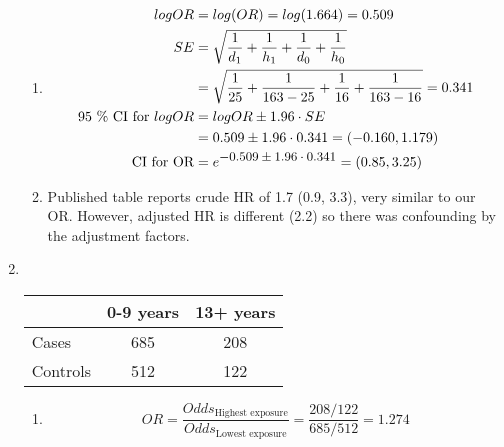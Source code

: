 \documentclass[12pt,a4paper,twoside]{article}
\begin{document}
\begin{enumerate}[label=\bfseries Q\arabic*.]
\begin{enumerate}
  \item 
    \begin{align*}
      logOR                     & =log(OR)=log(1.664)=0.509                                                 \\
      SE                        & =\sqrt{\frac{1}{d_{1}}+\frac{1}{h_{1}}+\frac{1}{d_{0}}+\frac{1}{h_{0}}}   \\
                                & =\sqrt{\frac{1}{25}+\frac{1}{163-25}+\frac{1}{16}+\frac{1}{163-16}}=0.341 \\       
      \text{95 \% CI for }logOR & = logOR \pm 1.96 \cdot SE                                                 \\
                                & = 0.509 \pm 1.96 \cdot 0.341 = (-0.160, 1.179)                            \\
      \text{CI for OR}          & = e^{\mbox{\small$-0.509 \pm 1.96 \cdot 0.341$}}=(0.85, 3.25)
    \end{align*}
  \item
    Published table reports crude HR of 1.7 (0.9, 3.3), very similar to
    our OR. However, adjusted HR is different (2.2) so there was confounding by the adjustment factors.
  \end{enumerate}
  
\item \
  
  \begin{center}
    \begin{tabular}{ l c c }
    & 0-9 years & 13+ years \\ \hline
      Cases    & 685       & 208       \\
    Controls & 512       & 122       \\                  
  \end{tabular}
\end{center}


  \begin{enumerate}
  \item
    \begin{equation*}
      OR= \frac{Odds_{\text{Highest exposure}}}{Odds_{\text{Lowest
            exposure}}}
      =\frac{208/122}{685/512}=1.274
    \end{equation*}
    

\end{enumerate}
\end{enumerate}
\end{document}
